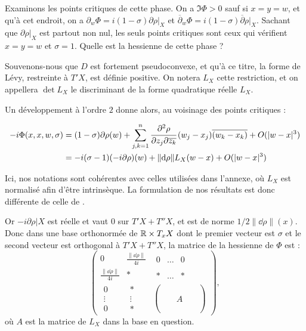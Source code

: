 Examinons les points critiques de cette phase. On a $\Im \Phi >0$ sauf si $x=y=w$, et qu'à cet endroit, on a $\partial_w\Phi = i(1-\sigma)\partial \rho|_X$ et $\overline{\partial}_w\Phi=i(1-\sigma)\overline{\partial}\rho|_X$. Sachant que $\partial \rho|_X$ est partout non nul, les seuls points critiques sont ceux qui vérifient $x=y=w$ et $\sigma =1$.
Quelle est la hessienne de cette phase ? 

Souvenons-nous que $D$ est fortement pseudoconvexe, et qu'à ce titre, la forme de Lévy, restreinte à $T'X$, est définie positive. On notera $L_X$ cette restriction, et on appellera $\det L_X$ le discriminant de la forme quadratique réelle $L_X$. 

Un développement à l'ordre $2$ donne alors, au voisinage des points critiques :

\begin{align*}
  -i\Phi(x,x,w,\sigma)&=(1-\sigma) \partial\rho(w) + \sum_{j,k=1}^n\cfrac{\partial^2\rho}{\partial z_j\partial \overline{z_k}}\,(w_j-x_j)\overline{(w_k-x_k)} + O(|w-x|^3)\\
  &= -i(\sigma-1) (-i\partial\rho)(w) + \|\mathrm{d}\rho\|L_{X}(w-x) + O(|w-x|^3)
\end{align*}

\begin{rem}
Ici, nos notations sont cohérentes avec celles utilisées dans l'annexe, où $L_X$ est normalisé afin d'être intrinsèque. La formulation de nos résultats est donc différente de celle de \cite{BoutetdeMonvel1975}.
\end{rem}

Or $-i\partial \rho|X$ est réelle et vaut $0$ sur $T'X+T''X$, et est de norme $1/2 \|\dd\rho\|(x)$. Donc dans une base orthonormée de $\mathbb{R}\times T_xX$ dont le premier vecteur est $\sigma$ et le second vecteur est orthogonal à $T'X+T''X$, la matrice de la hessienne de $\Phi$ est :
\begin{equation*}
\begin{pmatrix}
  0 & \frac{\|\dd\rho\|}{4i} &\begin{matrix}0&\ldots & 0\end{matrix}\\
  \frac{\|\dd\rho\|}{4i} & * & \begin{matrix}*&\ldots & *\end{matrix}\\
  \begin{matrix}0\\\vdots\\0\end{matrix}& \begin{matrix}*\\\vdots\\*\end{matrix}&\begin{pmatrix}\phantom{A}&\phantom{A}&\phantom{A}\\\phantom{A}&A&\phantom{A}\\\phantom{A}&\phantom{A}&\phantom{A}\end{pmatrix}
\end{pmatrix},
\end{equation*}
où $A$ est la matrice de $L_X$ dans la base en question. 

